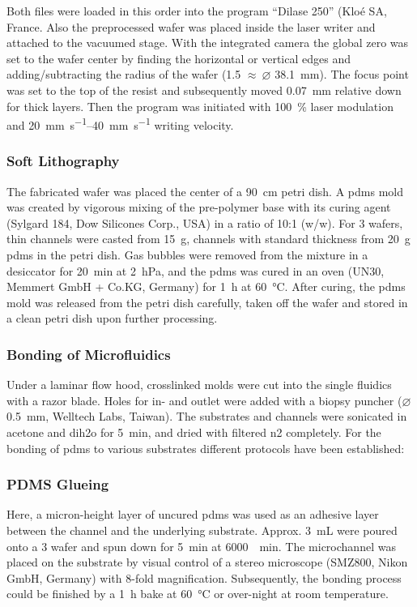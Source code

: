 Both files were loaded in this order into the program ``Dilase 250'' (Klo\'{e} SA, France. Also the preprocessed wafer was placed inside the laser writer and attached to the vacuumed stage. With the integrated camera the global zero was set to the wafer center by finding the horizontal or vertical edges and adding/subtracting the radius of the wafer (\SI{1.5}{\inch} $\approx\ \varnothing $  \SI{38.1}{\milli\meter}). The focus point was set to the top of the resist and subsequently moved \SI{.07}{\milli\meter} relative down for thick layers. Then the program was initiated with \SI{100}{\percent} laser modulation and \SIrange{20}{40}{\milli\meter\per\second} writing velocity.

\subsubsection{Soft Lithography}
The fabricated wafer was placed the center of a \SI{90}{\centi\meter} petri dish. A \gls{pdms} mold was created by vigorous mixing of the pre-polymer base with its curing agent (Sylgard 184, Dow Silicones Corp., USA) in a ratio of 10:1 (w/w). For \SI{3}{\inch} wafers, thin channels were casted from \SI{15}{\gram}, channels with standard thickness from \SI{20}{\gram} \gls{pdms} in the petri dish. Gas bubbles were removed from the mixture in a desiccator for \SI{20}{\minute} at \SI{2}{\hecto\pascal}, and the \gls{pdms} was cured in an oven (UN30, Memmert GmbH + Co.KG, Germany) for \SI{1}{\hour} at \SI{60}{\degreeCelsius}. After curing, the \gls{pdms} mold was released from the petri dish carefully, taken off the wafer and stored in a clean petri dish upon further processing.  

\subsubsection{Bonding of Microfluidics}
Under a laminar flow hood, crosslinked molds were cut into the single fluidics with a razor blade. Holes for in- and outlet were added with a biopsy puncher ($\varnothing $ \SI{0.5}{\milli\meter}, Welltech Labs, Taiwan). The substrates and channels were sonicated in acetone and \gls{dih2o} for \SI{5}{\minute}, and dried with filtered \gls{n2} completely. For the bonding of \gls{pdms} to various substrates different protocols have been established:

\subsubsection{PDMS Glueing}
\label{sec:meth:bond:glue}
Here, a micron-height layer of uncured \gls{pdms} was used as an adhesive layer between the channel and the underlying substrate. Approx. \SI{3}{\milli\liter} were poured onto a \SI{3}{\inch} wafer and spun down for \SI{5}{\minute} at \SI{6000}{\per\minute}. The microchannel was placed on the substrate by visual control of a stereo microscope (SMZ800, Nikon GmbH, Germany) with 8-fold magnification. Subsequently, the bonding process could be finished by a \SI{1}{\hour} bake at \SI{60}{\degreeCelsius} or over-night at room temperature.
